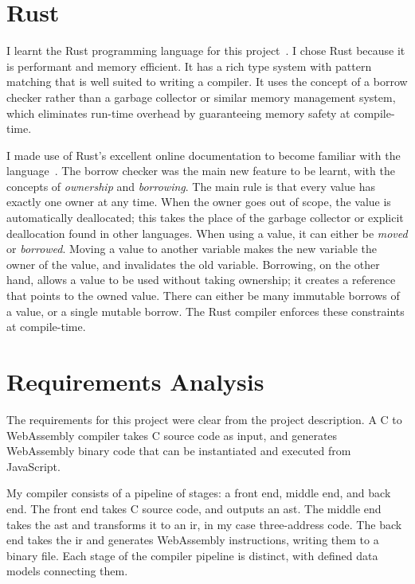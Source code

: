 \documentclass[00-main.tex]{subfiles}
\begin{document}
\section{Rust}\label{sec:prep:rust}

I learnt the Rust programming language for this project~.
I chose Rust because it is performant and memory efficient.
It has a rich type system with pattern matching that is well suited to writing a compiler.
It uses the concept of a borrow checker rather than a garbage collector or similar memory management system, which eliminates run-time overhead by guaranteeing memory safety at compile-time.

I made use of Rust's excellent online documentation to become familiar with the language~.
The borrow checker was the main new feature to be learnt, with the concepts of \emph{ownership} and \emph{borrowing}.
The main rule is that every value has exactly one owner at any time.
When the owner goes out of scope, the value is automatically deallocated; this takes the place of the garbage collector or explicit deallocation found in other languages.
When using a value, it can either be \emph{moved} or \emph{borrowed}.
Moving a value to another variable makes the new variable the owner of the value, and invalidates the old variable.
Borrowing, on the other hand, allows a value to be used without taking ownership; it creates a reference that points to the owned value.
There can either be many immutable borrows of a value, or a single mutable borrow.
The Rust compiler enforces these constraints at compile-time.

\section{Requirements Analysis}

The requirements for this project were clear from the project description.
A C to WebAssembly compiler takes C source code as input, and generates WebAssembly binary code that can be instantiated and executed from JavaScript.

My compiler consists of a pipeline of stages: a front end, middle end, and back end.
The front end takes C source code, and outputs an \gls{ast}.
The middle end takes the \gls{ast} and transforms it to an \gls{ir}, in my case three-address code.
The back end takes the \gls{ir} and generates WebAssembly instructions, writing them to a binary file.
Each stage of the compiler pipeline is distinct, with defined data models connecting them.
\end{document}

